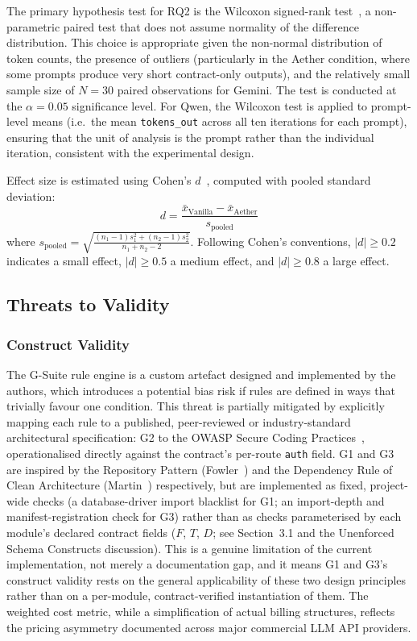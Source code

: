 \documentclass[review,12pt,3p]{elsarticle}
\begin{document}
The primary hypothesis test for RQ2 is the Wilcoxon signed-rank test~\citep{Wilcoxon1945},
a non-parametric paired test that does not assume normality of the difference distribution.
This choice is appropriate given the non-normal distribution of token counts, the presence
of outliers (particularly in the Aether condition, where some prompts produce very short
contract-only outputs), and the relatively small sample size of $N = 30$ paired observations
for Gemini. The test is conducted at the $\alpha = 0.05$ significance level. For Qwen, the
Wilcoxon test is applied to prompt-level means (i.e.\ the mean \texttt{tokens\_out} across
all ten iterations for each prompt), ensuring that the unit of analysis is the prompt rather
than the individual iteration, consistent with the experimental design.

Effect size is estimated using Cohen's $d$~\citep{Cohen1988}, computed with pooled standard
deviation:
\begin{equation}
  d = \frac{\bar{x}_{\text{Vanilla}} - \bar{x}_{\text{Aether}}}{s_{\text{pooled}}}
  \label{eq:cohens_d}
\end{equation}
where $s_{\text{pooled}} = \sqrt{\frac{(n_1 - 1)s_1^2 + (n_2 - 1)s_2^2}{n_1 + n_2 - 2}}$.
Following Cohen's conventions, $|d| \geq 0.2$ indicates a small effect, $|d| \geq 0.5$
a medium effect, and $|d| \geq 0.8$ a large effect.

\subsection{Threats to Validity}

\subsubsection{Construct Validity}

The G-Suite rule engine is a custom artefact designed and implemented by the authors, which
introduces a potential bias risk if rules are defined in ways that trivially favour one
condition. This threat is partially mitigated by explicitly mapping each rule to a published,
peer-reviewed or industry-standard architectural specification: G2 to the OWASP Secure
Coding Practices~\citep{OWASP2023Secure}, operationalised directly against the contract's
per-route \texttt{auth} field. G1 and G3 are inspired by the Repository Pattern
(Fowler~\citep{Fowler2002PEAA}) and the Dependency Rule of Clean Architecture
(Martin~\citep{Martin2017CleanArch}) respectively, but are implemented as fixed,
project-wide checks (a database-driver import blacklist for G1; an import-depth and
manifest-registration check for G3) rather than as checks parameterised by each module's
declared contract fields ($F$, $T$, $D$; see Section~3.1 and the Unenforced Schema
Constructs discussion). This is a genuine limitation of the current implementation, not
merely a documentation gap, and it means G1 and G3's construct validity rests on the
general applicability of these two design principles rather than on a per-module,
contract-verified instantiation of them.
The weighted cost metric, while a simplification of actual billing structures, reflects the
pricing asymmetry documented across major commercial LLM API providers.
\end{document}
